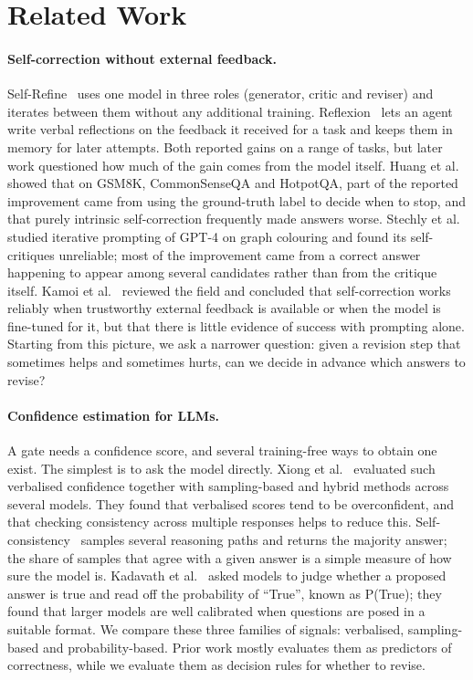\section{Related Work}
\label{sec:related_work}

\paragraph{Self-correction without external feedback.}
Self-Refine~\cite{madaan2023selfrefine} uses one model in three roles (generator, critic and reviser) and iterates between them without any additional training. Reflexion~\cite{shinn2023reflexion} lets an agent write verbal reflections on the feedback it received for a task and keeps them in memory for later attempts. Both reported gains on a range of tasks, but later work questioned how much of the gain comes from the model itself. Huang et al.~\cite{huang2024cannot} showed that on GSM8K, CommonSenseQA and HotpotQA, part of the reported improvement came from using the ground-truth label to decide when to stop, and that purely intrinsic self-correction frequently made answers worse. Stechly et al.~\cite{stechly2023gpt4} studied iterative prompting of GPT-4 on graph colouring and found its self-critiques unreliable; most of the improvement came from a correct answer happening to appear among several candidates rather than from the critique itself. Kamoi et al.~\cite{kamoi2024when} reviewed the field and concluded that self-correction works reliably when trustworthy external feedback is available or when the model is fine-tuned for it, but that there is little evidence of success with prompting alone. Starting from this picture, we ask a narrower question: given a revision step that sometimes helps and sometimes hurts, can we decide in advance which answers to revise?

\paragraph{Confidence estimation for LLMs.}
A gate needs a confidence score, and several training-free ways to obtain one exist. The simplest is to ask the model directly. Xiong et al.~\cite{xiong2024can} evaluated such verbalised confidence together with sampling-based and hybrid methods across several models. They found that verbalised scores tend to be overconfident, and that checking consistency across multiple responses helps to reduce this. Self-consistency~\cite{wang2023selfconsistency} samples several reasoning paths and returns the majority answer; the share of samples that agree with a given answer is a simple measure of how sure the model is. Kadavath et al.~\cite{kadavath2022language} asked models to judge whether a proposed answer is true and read off the probability of ``True'', known as P(True); they found that larger models are well calibrated when questions are posed in a suitable format. We compare these three families of signals: verbalised, sampling-based and probability-based. Prior work mostly evaluates them as predictors of correctness, while we evaluate them as decision rules for whether to revise.

